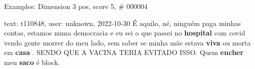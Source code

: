 \begin{frame}{Examples: Dimension 3 pos, score 5, \# 000004}
\footnotesize
\begin{exampleblock}{text: t110848, user: unknown, 2022-10-30}
É aquilo, né, ninguém paga minhas contas, estamos numa democracia e eu sei o 
que passei no \textbf{hospital} com covid vendo gente morrer do meu lado, sem 
saber se minha mãe estava \textbf{viva} ou morta em \textbf{casa} . SENDO QUE A 
VACINA TERIA EVITADO ISSO. Quem \textbf{encher} meu \textbf{saco} é block. 
\end{exampleblock}
\end{frame}
